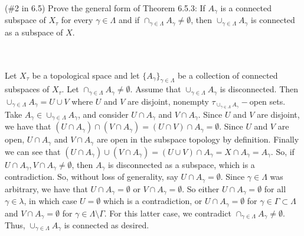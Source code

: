 (\#2 in 6.5) Prove the general form of Theorem 6.5.3: If $A_{\gamma}$ is a connected subspace of
$X_{\tau}$ for every $\gamma\in \Lambda$ and if $\cap_{\gamma\in\Lambda} A_{\gamma}\neq \emptyset$, then
$\cup_{\gamma\in\Lambda}A_\gamma$ is connected as a subspace of $X$.\\\\

\begin{solution}\renewcommand{\qedsymbol}{}\ \\
    Let $X_{\tau}$ be a topological space and let $\{A_{\gamma}\}_{\gamma\in\Lambda}$ be a collection of
    connected subspaces of $X_{\tau}$. Let $\cap_{\gamma\in\Lambda}A_{\gamma}\neq\emptyset$. Assume that
    $\cup_{\gamma\in\Lambda} A_{\gamma}$ is disconnected. Then
    $\cup_{\gamma\in\Lambda}A_{\gamma}=U\cup V$ where $U$ and $V$ are disjoint, nonempty
    $\tau_{\cup_{\gamma\in\Lambda} A_{\gamma}}-$open sets. Take
    $A_{\gamma}\in\cup_{\gamma\in\Lambda} A_{\gamma}$, and consider $U\cap A_{\gamma}$ and
    $V\cap A_{\gamma}$. Since $U$ and $V$ are disjoint, we have that
    $(U\cap A_{\gamma})\cap(V\cap A_{\gamma})=(U\cap V)\cap A_{\gamma}=\emptyset$. Since $U$ and $V$ are
    open, $U\cap A_{\gamma}$ and $V\cap A_{\gamma}$ are open in the subspace topology by definition.
    Finally we can see that
    $(U\cap A_{\gamma})\cup(V\cap A_{\gamma})=(U\cup V)\cap A_{\gamma}=X\cap A_{\gamma}=A_{\gamma}$. So,
    if $U\cap A_{\gamma}, V\cap A_{\gamma}\neq\emptyset$, then $A_{\gamma}$ is disconnected as a
    subspace, which is a contradiction. So, without loss of generality, say
    $U\cap A_{\gamma}=\emptyset$. Since $\gamma\in\Lambda$ was arbitrary, we have that
    $U\cap A_{\gamma}=\emptyset$ or $V\cap A_{\gamma}=\emptyset$. So either $U\cap A_{\gamma}=\emptyset$
    for all $\gamma\in\lambda$, in which case $U=\emptyset$ which is a contradiction, or
    $U\cap A_{\gamma}=\emptyset$ for $\gamma\in\Gamma\subset\Lambda$ and $V\cap A_{\gamma}=\emptyset$
    for $\gamma\in\Lambda\setminus\Gamma$. For this latter case, we contradict
    $\cap_{\gamma\in\Lambda} A_{\gamma}\neq \emptyset$. Thus, $\cup_{\gamma\in\Lambda} A_{\gamma}$ is
    connected as desired.

\end{solution}